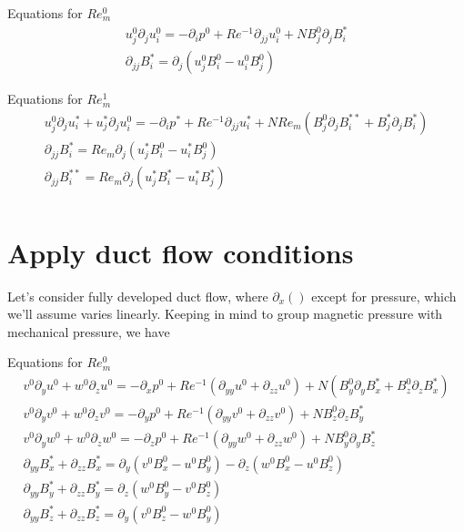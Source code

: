 \documentclass[11pt]{article}
\newcommand{\PD}{\partial}
\begin{document}
Equations for $Re_m^0$
\begin{equation}\boxed{\begin{aligned}
u_j^0 \PD_j u_i^0 = -\PD_i p^0 + Re^{-1} \PD_{jj} u_i^0 + N B_j^0 \PD_j B_i^* \\
\PD_{jj} B_i^* = \PD_j ( u_j^0 B_i^0 - u_i^0 B_j^0)
\end{aligned}}\end{equation}

Equations for $Re_m^1$
\begin{equation}\boxed{\begin{aligned}
u_j^0 \PD_j u_i^* + u_j^* \PD_j u_i^0 = -\PD_i p^*+ Re^{-1} \PD_{jj} u_i^* + N Re_m ( B_j^0 \PD_j B_i^{**} + B_j^* \PD_j B_i^* ) \\
\PD_{jj} B_i^{*}  = Re_m \PD_j (u_j^* B_i^{0} - u_i^* B_j^{0}) \\
\PD_{jj} B_i^{**} = Re_m \PD_j (u_j^* B_i^{*} - u_i^* B_j^{*}) \\
\end{aligned}}\end{equation}

\section{Apply duct flow conditions}
Let's consider fully developed duct flow, where $\PD_x()$ except for pressure, which we'll assume varies linearly. 
Keeping in mind to group magnetic pressure with mechanical pressure, we have

Equations for $Re_m^0$
\begin{equation}\begin{aligned}
v^0 \PD_y u^0 + w^0 \PD_z u^0 = -\PD_x p^0 + Re^{-1} (\PD_{yy} u^0 + \PD_{zz} u^0 ) + N (B_y^0 \PD_y B_x^* + B_z^0 \PD_z B_x^*) \\
v^0 \PD_y v^0 + w^0 \PD_z v^0 = -\PD_y p^0 + Re^{-1} (\PD_{yy} v^0 + \PD_{zz} v^0 ) + N  B_z^0 \PD_z B_y^* \\
v^0 \PD_y w^0 + w^0 \PD_z w^0 = -\PD_z p^0 + Re^{-1} (\PD_{yy} w^0 + \PD_{zz} w^0 ) + N  B_y^0 \PD_y B_z^* \\
\PD_{yy} B_x^* + \PD_{zz} B_x^* = \PD_y ( v^0 B_x^0 - u^0 B_y^0) - \PD_z ( w^0 B_x^0 - u^0 B_z^0) \\
\PD_{yy} B_y^* + \PD_{zz} B_y^* = \PD_z ( w^0 B_y^0 - v^0 B_z^0) \\
\PD_{yy} B_z^* + \PD_{zz} B_z^* = \PD_y ( v^0 B_z^0 - w^0 B_y^0) \\
\end{aligned}\end{equation}
\end{document}
